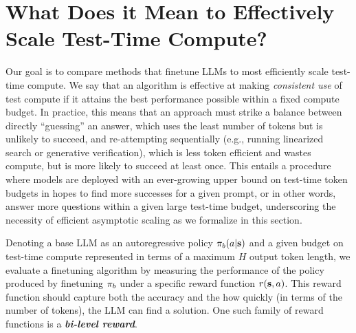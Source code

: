 \section{What Does it Mean to Effectively Scale Test-Time Compute?}
\vspace{-0.1cm}
Our goal is to compare methods that finetune LLMs to most efficiently scale test-time compute. We say that an algorithm is effective at making \emph{consistent use} of test compute if it attains the best performance possible within a fixed compute budget. In practice, this means that an approach must strike a balance between directly ``guessing'' an answer, which uses the least number of tokens but is unlikely to succeed, and re-attempting sequentially (e.g., running linearized search or generative verification),
which is less token efficient and wastes compute, but is more likely to succeed at least once. This entails a procedure where models are deployed with an ever-growing upper bound on test-time token budgets in hopes to find more successes for a given prompt, or in other words, answer more questions within a given large test-time budget, underscoring the necessity of efficient asymptotic scaling as we formalize in this section.

Denoting a base LLM as an autoregressive policy $\pi_b(a|\mathbf{s})$ and a given budget on test-time compute represented in terms of a maximum $H$ output token length, we evaluate a finetuning algorithm by measuring the performance of the policy produced by finetuning $\pi_b$ under a specific reward function $r(\mathbf{s}, a)$. This reward function should capture both the accuracy and the how quickly (in terms of the number of tokens), the LLM can find a solution. One such family of reward functions is a \textbf{\emph{bi-level reward}}. 





